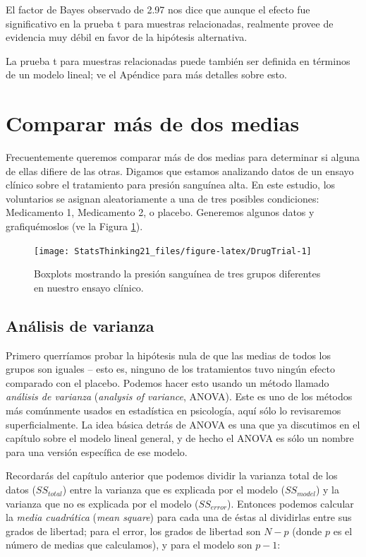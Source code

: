 \documentclass[
  12pt,
]{book}
\theoremstyle{definition}
\theoremstyle{definition}
\theoremstyle{definition}
\theoremstyle{remark}
\begin{document}
El factor de Bayes observado de 2.97 nos dice que aunque el efecto fue significativo en la prueba t para muestras relacionadas, realmente provee de evidencia muy débil en favor de la hipótesis alternativa.

La prueba t para muestras relacionadas puede también ser definida en términos de un modelo lineal; ve el Apéndice para más detalles sobre esto.

\hypertarget{comparar-muxe1s-de-dos-medias}{%
\section{Comparar más de dos medias}\label{comparar-muxe1s-de-dos-medias}}

Frecuentemente queremos comparar más de dos medias para determinar si alguna de ellas difiere de las otras. Digamos que estamos analizando datos de un ensayo clínico sobre el tratamiento para presión sanguínea alta. En este estudio, los voluntarios se asignan aleatoriamente a una de tres posibles condiciones: Medicamento 1, Medicamento 2, o placebo. Generemos algunos datos y grafiquémoslos (ve la Figura \ref{fig:DrugTrial}).

\begin{figure}
\texttt{[image: StatsThinking21\_files/figure-latex/DrugTrial-1]} \caption{Boxplots mostrando la presión sanguínea de tres grupos diferentes en nuestro ensayo clínico.}\label{fig:DrugTrial}
\end{figure}

\hypertarget{ANOVA}{%
\subsection{Análisis de varianza}\label{ANOVA}}

Primero querríamos probar la hipótesis nula de que las medias de todos los grupos son iguales -- esto es, ninguno de los tratamientos tuvo ningún efecto comparado con el placebo. Podemos hacer esto usando un método llamado \emph{análisis de varianza} (\emph{analysis of variance}, ANOVA). Este es uno de los métodos más comúnmente usados en estadística en psicología, aquí sólo lo revisaremos superficialmente. La idea básica detrás de ANOVA es una que ya discutimos en el capítulo sobre el modelo lineal general, y de hecho el ANOVA es sólo un nombre para una versión específica de ese modelo.

Recordarás del capítulo anterior que podemos dividir la varianza total de los datos (\(SS_{total}\)) entre la varianza que es explicada por el modelo (\(SS_{model}\)) y la varianza que no es explicada por el modelo (\(SS_{error}\)). Entonces podemos calcular la \emph{media cuadrática} (\emph{mean square}) para cada una de éstas al dividirlas entre sus grados de libertad; para el error, los grados de libertad son \(N - p\) (donde \(p\) es el número de medias que calculamos), y para el modelo son \(p - 1\):
\end{document}
